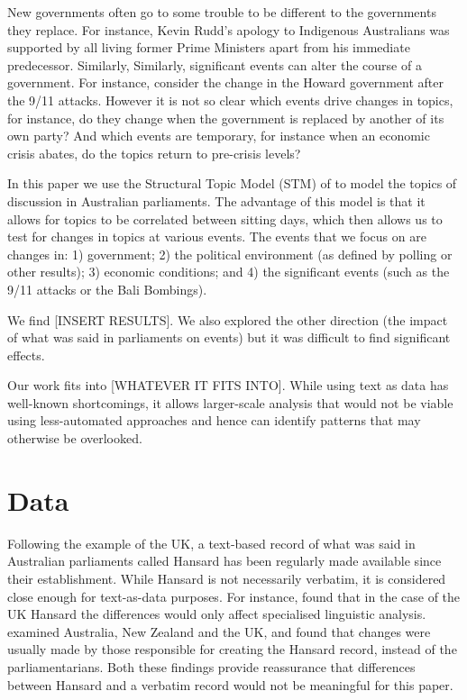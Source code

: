 \documentclass[12pt,]{article}
\begin{document}
New governments often go to some trouble to be different to the
governments they replace. For instance, Kevin Rudd's apology to
Indigenous Australians was supported by all living former Prime
Ministers apart from his immediate predecessor. Similarly, Similarly,
significant events can alter the course of a government. For instance,
consider the change in the Howard government after the 9/11 attacks.
However it is not so clear which events drive changes in topics, for
instance, do they change when the government is replaced by another of
its own party? And which events are temporary, for instance when an
economic crisis abates, do the topics return to pre-crisis levels?

In this paper we use the Structural Topic Model (STM) of
\citet{RobertsStewartAiroldi2016} to model the topics of discussion in
Australian parliaments. The advantage of this model is that it allows
for topics to be correlated between sitting days, which then allows us
to test for changes in topics at various events. The events that we
focus on are changes in: 1) government; 2) the political environment (as
defined by polling or other results); 3) economic conditions; and 4) the
significant events (such as the 9/11 attacks or the Bali Bombings).

We find {[}INSERT RESULTS{]}. We also explored the other direction (the
impact of what was said in parliaments on events) but it was difficult
to find significant effects.

Our work fits into {[}WHATEVER IT FITS INTO{]}. While using text as data
has well-known shortcomings, it allows larger-scale analysis that would
not be viable using less-automated approaches and hence can identify
patterns that may otherwise be overlooked.

\section{Data}\label{data}

Following the example of the UK, a text-based record of what was said in
Australian parliaments called Hansard has been regularly made available
since their establishment. While Hansard is not necessarily verbatim, it
is considered close enough for text-as-data purposes. For instance,
\citet{Mollin2008} found that in the case of the UK Hansard the
differences would only affect specialised linguistic analysis.
\citet{Edwards2016} examined Australia, New Zealand and the UK, and
found that changes were usually made by those responsible for creating
the Hansard record, instead of the parliamentarians. Both these findings
provide reassurance that differences between Hansard and a verbatim
record would not be meaningful for this paper.
\end{document}
